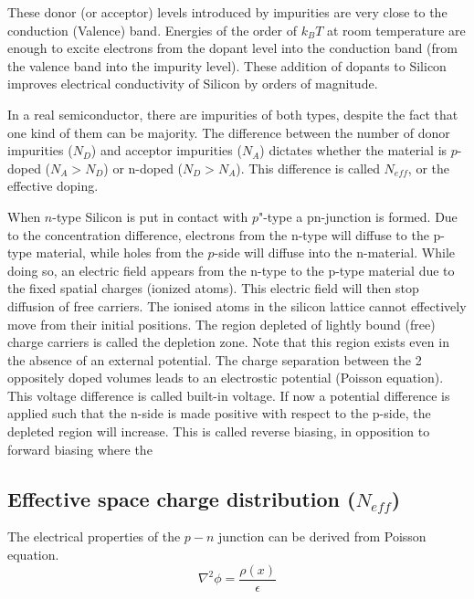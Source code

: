 These donor (or acceptor) levels introduced by impurities are very close to the
conduction (Valence) band. Energies of the order of $k_B T$ at room temperature
are enough to excite electrons from the dopant level into the conduction band
(from the valence band into the impurity level). These addition of dopants to
Silicon improves electrical conductivity of Silicon by orders of magnitude.

In a real semiconductor, there are impurities of both types, despite the fact
that one kind of them can be majority. The difference between the number of
donor impurities ($N_D$) and acceptor impurities ($N_A$) dictates whether the
material is $p$-doped ($N_A > N_D $) or n-doped ($N_D > N_A$). This difference
is called $N_{eff}$, or the effective doping.

When $n$-type Silicon is put in contact with $p$"-type a pn-junction is formed.
Due to the concentration difference, electrons from the n-type will diffuse to
the p-type material, while holes from the $p$-side will diffuse into the
n-material. While doing so, an electric field appears from the n-type to the
p-type material due to the fixed spatial charges (ionized atoms). This electric
field will then stop diffusion of free carriers. The ionised atoms in the
silicon lattice cannot effectively move from their initial positions. The region
depleted of lightly bound (free) charge carriers is called the depletion zone.
Note that this region exists even in the absence of an external potential. The
charge separation between the 2 oppositely doped volumes leads to an electrostic
potential (Poisson equation). This voltage difference is called built-in
voltage. If now a potential difference is applied such that the n-side is made
positive with respect to the p-side, the depleted region will increase. This is
called reverse biasing, in opposition to forward biasing where the 


\subsection{Effective space charge distribution ($N_{eff}$)} 

The electrical properties of the $p-n$ junction can be derived from Poisson equation. 
\begin{equation}
\nabla^2 \phi = \frac{\rho(x)}{\epsilon} 
\label{eq:poisson}
\end{equation}

